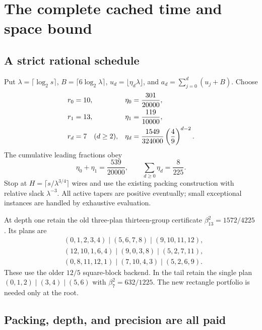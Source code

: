 \section{The complete cached time and space bound}
\label{sec:schedule}

\subsection{A strict rational schedule}

Put $\lambda=\lceil\log_2s\rceil$, $B=\lceil6\log_2\lambda\rceil$,
$u_d=\lfloor\eta_d\lambda\rfloor$, and
$a_d=\sum_{j=0}^d(u_j+B)$. Choose
\begin{align}
 r_0&=10,&\eta_0&=\frac{301}{20000},\notag\\
 r_1&=13,&\eta_1&=\frac{119}{10000},\notag\\
 r_d&=7\quad(d\ge2),&
 \eta_d&=\frac{1549}{324000}\left(\frac49\right)^{d-2}.
 \label{eq:schedule}
\end{align}
The cumulative leading fractions obey
\[
 \eta_0+\eta_1=\frac{539}{20000},\qquad
 \sum_{d\ge0}\eta_d=\frac8{225}.
\]
Stop at $H=\lceil s/\lambda^{3/4}\rceil$ wires and use the existing
packing construction with relative slack $\lambda^{-3}$. All active
tapers are positive eventually; small exceptional instances are handled
by exhaustive evaluation.

At depth one retain the old three-plan thirteen-group certificate
$\beta_{13}^2=1572/4225$ \cite{trees}. Its plans are
\begin{align*}
 &(0,1,2,3,4)\mid(5,6,7,8)\mid(9,10,11,12),\\
 &(12,10,1,6,4)\mid(9,0,3,8)\mid(5,2,7,11),\\
 &(0,8,11,12,1)\mid(7,10,4,3)\mid(5,2,6,9).
\end{align*}
These use the older $12/5$ square-block backend. In the tail retain the
single plan $(0,1,2)\mid(3,4)\mid(5,6)$ with
$\beta_7^2=632/1225$. The new rectangle portfolio is needed only at the root.

\subsection{Packing, depth, and precision are all paid}


